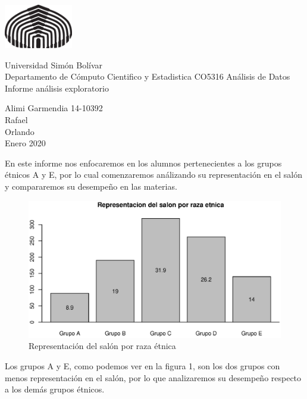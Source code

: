 \documentclass{article}
\begin{document}
\parbox{3.3cm}{\includegraphics[width=3cm]{usblogo.eps}}\parbox{8cm}{Universidad
   Sim\'on Bol\'ivar\\
   Departamento de C\'omputo Cientifico y Estadistica
   \hspace{1cm}CO5316 An\'alisis de Datos\\
   Informe an\'alisis exploratorio}\parbox{17cm}{ \hspace{1cm}Alimi Garmendia 14-10392\\
  \hspace*{1cm}Rafael \\
  \hspace*{1cm}Orlando \\
   \hspace*{1cm}Enero 2020}
   \vspace{1cm}

    En este informe nos enfocaremos en los alumnos pertenecientes a los grupos \'etnicos A y E, por lo cual comenzaremos an\'alizando
    su representaci\'on en el sal\'on y compararemos su desempe\~no en las materias.
    

    \begin{figure}[h]
        \includegraphics[scale = 0.8]{Output/Plots/1_Representaciondelsalonporrazaetnica.eps}
        \caption{Representaci\'on del sal\'on por raza \'etnica}
        \label{fig:minipage1}
    \end{figure}

    Los grupos A y E, como podemos ver en la figura 1, son los dos grupos con menos representaci\'on en el sal\'on, por lo
    que analizaremos su desempe\~no respecto a los dem\'as grupos \'etnicos.
\end{document}
